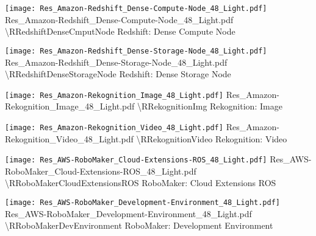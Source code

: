  {\texttt{[image: Res\_Amazon-Redshift\_Dense-Compute-Node\_48\_Light.pdf]}} {Res\_Amazon-Redshift\_Dense-Compute-Node\_48\_Light.pdf} {{\textbackslash}RRedshiftDenseCmputNode} {Redshift: Dense Compute Node}

 {\texttt{[image: Res\_Amazon-Redshift\_Dense-Storage-Node\_48\_Light.pdf]}} {Res\_Amazon-Redshift\_Dense-Storage-Node\_48\_Light.pdf} {{\textbackslash}RRedshiftDenseStorageNode} {Redshift: Dense Storage Node}

 {\texttt{[image: Res\_Amazon-Rekognition\_Image\_48\_Light.pdf]}} {Res\_Amazon-Rekognition\_Image\_48\_Light.pdf} {{\textbackslash}RRekognitionImg} {Rekognition: Image}

 {\texttt{[image: Res\_Amazon-Rekognition\_Video\_48\_Light.pdf]}} {Res\_Amazon-Rekognition\_Video\_48\_Light.pdf} {{\textbackslash}RRekognitionVideo} {Rekognition: Video}

 {\texttt{[image: Res\_AWS-RoboMaker\_Cloud-Extensions-ROS\_48\_Light.pdf]}} {Res\_AWS-RoboMaker\_Cloud-Extensions-ROS\_48\_Light.pdf} {{\textbackslash}RRoboMakerCloudExtensionsROS} {RoboMaker: Cloud Extensions ROS}

 {\texttt{[image: Res\_AWS-RoboMaker\_Development-Environment\_48\_Light.pdf]}} {Res\_AWS-RoboMaker\_Development-Environment\_48\_Light.pdf} {{\textbackslash}RRoboMakerDevEnvironment} {RoboMaker: Development Environment}

